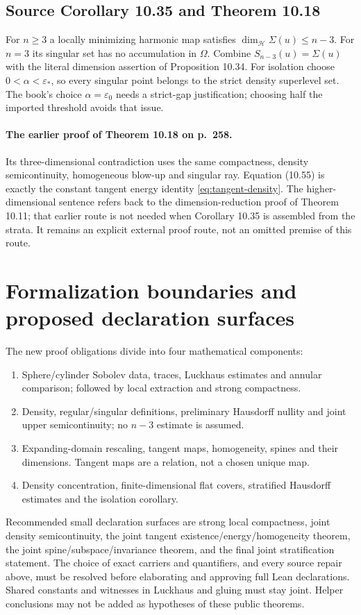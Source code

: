 \documentclass[11pt,a4paper]{article}
\numberwithin{equation}{section}
\theoremstyle{definition}
\theoremstyle{remark}
\newcommand{\HH}{\mathcal H}
\newcommand{\dimH}{\operatorname{dim}_{\HH}}
\begin{document}
\subsection{Source Corollary 10.35 and Theorem 10.18}
\label{cor:singular-dimension}
For $n\ge3$ a locally minimizing harmonic map satisfies
$\dimH\Sigma(u)\le n-3$. For $n=3$ its singular set has no
accumulation in $\Omega$. Combine $S_{n-3}(u)=\Sigma(u)$ with the
literal dimension assertion of Proposition 10.34. For isolation choose
$0<\alpha<\varepsilon_*$,
so every singular point belongs to the strict density superlevel set.
The book's choice $\alpha=\varepsilon_0$ needs a strict-gap justification;
choosing half the imported threshold avoids that issue.

\paragraph{The earlier proof of Theorem 10.18 on p.~258.}
Its three-dimensional contradiction uses the same compactness, density
semicontinuity, homogeneous blow-up and singular ray. Equation (10.55)
is exactly the constant tangent energy identity
\eqref{eq:tangent-density}. The higher-dimensional sentence refers back
to the dimension-reduction proof of Theorem 10.11; that earlier route is
not needed when Corollary 10.35 is assembled from the strata. It remains
an explicit external proof route, not an omitted premise of this route.

\section{Formalization boundaries and proposed declaration surfaces}
\label{sec:formalization}
The new proof obligations divide into four mathematical components:
\begin{enumerate}
 \item Sphere/cylinder Sobolev data, traces, Luckhaus estimates and
 annular comparison; followed by local extraction and strong compactness.
 \item Density, regular/singular definitions, preliminary Hausdorff nullity
 and joint upper semicontinuity; no $n-3$ estimate is assumed.
 \item Expanding-domain rescaling, tangent maps, homogeneity, spines and
 their dimensions. Tangent maps are a relation, not a chosen unique map.
 \item Density concentration, finite-dimensional flat covers, stratified
 Hausdorff estimates and the isolation corollary.
\end{enumerate}
Recommended small declaration surfaces are strong local compactness,
joint density semicontinuity, the joint tangent existence/energy/homogeneity
theorem, the joint spine/subspace/invariance theorem, and the final joint
stratification statement. The choice of exact carriers and quantifiers,
and every source repair above, must be resolved before elaborating and
approving full Lean declarations. Shared constants and witnesses in
Luckhaus and gluing must stay joint. Helper conclusions may not be added
as hypotheses of these public theorems.
\end{document}
